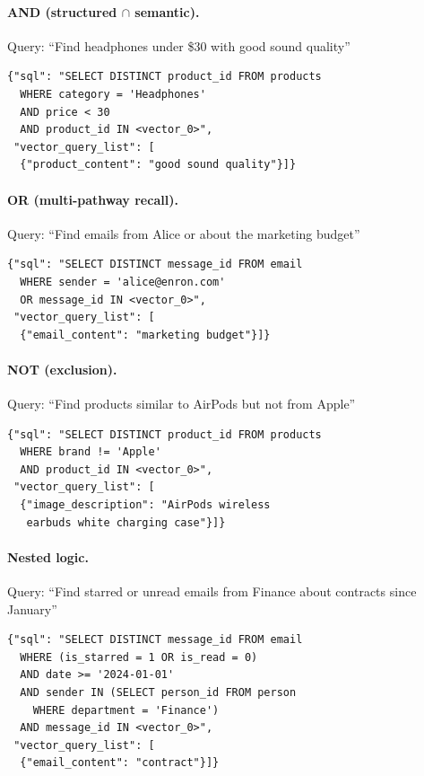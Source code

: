 \documentclass[11pt]{article}
\begin{document}
\paragraph{AND (structured $\cap$ semantic).}
Query: ``Find headphones under \$30 with good sound quality''
\begin{lstlisting}
{"sql": "SELECT DISTINCT product_id FROM products
  WHERE category = 'Headphones'
  AND price < 30
  AND product_id IN <vector_0>",
 "vector_query_list": [
  {"product_content": "good sound quality"}]}
\end{lstlisting}

\paragraph{OR (multi-pathway recall).}
Query: ``Find emails from Alice or about the marketing budget''
\begin{lstlisting}
{"sql": "SELECT DISTINCT message_id FROM email
  WHERE sender = 'alice@enron.com'
  OR message_id IN <vector_0>",
 "vector_query_list": [
  {"email_content": "marketing budget"}]}
\end{lstlisting}

\paragraph{NOT (exclusion).}
Query: ``Find products similar to AirPods but not from Apple''
\begin{lstlisting}
{"sql": "SELECT DISTINCT product_id FROM products
  WHERE brand != 'Apple'
  AND product_id IN <vector_0>",
 "vector_query_list": [
  {"image_description": "AirPods wireless
   earbuds white charging case"}]}
\end{lstlisting}

\paragraph{Nested logic.}
Query: ``Find starred or unread emails from Finance about contracts since January''
\begin{lstlisting}
{"sql": "SELECT DISTINCT message_id FROM email
  WHERE (is_starred = 1 OR is_read = 0)
  AND date >= '2024-01-01'
  AND sender IN (SELECT person_id FROM person
    WHERE department = 'Finance')
  AND message_id IN <vector_0>",
 "vector_query_list": [
  {"email_content": "contract"}]}
\end{lstlisting}
\end{document}
